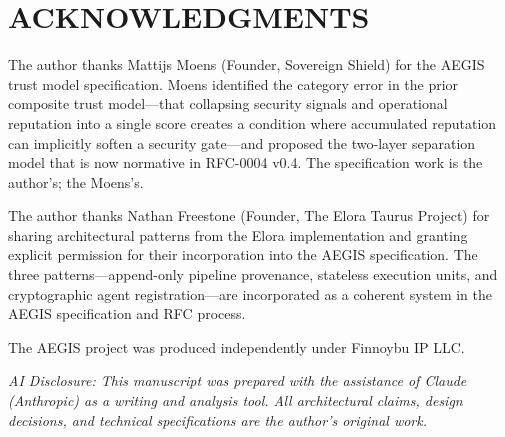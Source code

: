 \documentclass{IEEEcsmag}
\begin{document}

\section{ACKNOWLEDGMENTS}

The author thanks Mattijs Moens (Founder, Sovereign Shield) for  the AEGIS trust model specification. Moens identified the category error in the prior composite trust model---that collapsing security signals and operational reputation into a single score creates a condition where accumulated reputation can implicitly soften a security gate---and proposed the two-layer separation model that is now normative in RFC-0004 v0.4. The specification work is the author's; the  Moens's.

The author thanks Nathan Freestone (Founder, The Elora Taurus Project) for sharing architectural patterns from the Elora implementation and granting explicit permission for their incorporation into the AEGIS specification. The three patterns---append-only pipeline provenance, stateless execution units, and cryptographic agent registration---are incorporated as a coherent system in the AEGIS specification and RFC process. 

The AEGIS project was produced independently under Finnoybu IP LLC.

{\it AI Disclosure: This manuscript was prepared with the assistance of Claude (Anthropic) as a writing and analysis tool. All architectural claims, design decisions, and technical specifications are the author's original work.}
\end{document}

